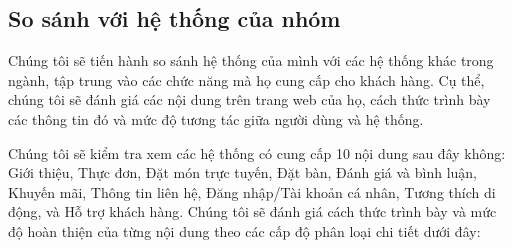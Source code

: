 \subsection{So sánh với hệ thống của nhóm}

Chúng tôi sẽ tiến hành so sánh hệ thống của mình với các hệ thống khác trong ngành, tập trung vào các chức năng mà họ cung cấp cho khách hàng. Cụ thể, chúng tôi sẽ đánh giá các nội dung trên trang web của họ, cách thức trình bày các thông tin đó và mức độ tương tác giữa người dùng và hệ thống.

Chúng tôi sẽ kiểm tra xem các hệ thống có cung cấp 10 nội dung sau đây không: Giới thiệu, Thực đơn, Đặt món trực tuyến, Đặt bàn, Đánh giá và bình luận, Khuyến mãi, Thông tin liên hệ, Đăng nhập/Tài khoản cá nhân, Tương thích di động, và Hỗ trợ khách hàng. Chúng tôi sẽ đánh giá cách thức trình bày và mức độ hoàn thiện của từng nội dung theo các cấp độ phân loại chi tiết dưới đây:


